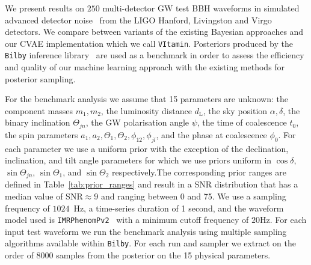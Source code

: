 \documentclass[%
showpacs,
nofootinbib,
 amsmath,amssymb,
 aps,
 twocolumn,
 prl,
 reprint,
floatfix,
]{revtex4-1}
\begin{document}
%
%

%
%
%
%
We present results on $250$ multi-detector \ac{GW} test \ac{BBH}
waveforms in simulated advanced detector noise~\cite{aligo_noisecurves}
from the LIGO Hanford, Livingston and Virgo detectors. We compare between
variants of the existing Bayesian approaches and our \ac{CVAE} implementation
which we call \texttt{VItamin}. Posteriors produced by the \texttt{Bilby}
inference library~\cite{1811.02042} are used as a benchmark in order to assess
the efficiency and quality of our machine learning approach with the existing
methods for posterior sampling.

%
%
For the benchmark analysis we assume that 15 parameters are
unknown: the component masses
$m_1,m_2$, the luminosity distance $d_{\text{L}}$, the sky position
$\alpha,\delta$, the binary inclination $\Theta_{jn}$, the \ac{GW} polarisation
angle ${\psi}$, the time of coalescence $t_{0}$, the spin parameters $a_1,a_2,
\Theta_1,\Theta_2,\phi_{12},\phi_{jl}$, and the phase at coalescence
$\phi_0$. For each parameter we use a uniform prior with the exception of 
the declination, inclination, and tilt angle parameters for 
which we use priors uniform in $\cos\delta$, $\sin\Theta_{jn}$, $\sin\Theta_1$, 
and $\sin\Theta_2$ respectively.The corresponding prior ranges
are defined in Table~\ref{tab:prior_ranges} and result in a  \ac{SNR}
distribution that has a median value of $\text{SNR}\approx 9$ and ranging between 0 and 75.
We use a sampling frequency of $1024$~Hz, a time-series duration of 1 second, and
the waveform model used is \texttt{IMRPhenomPv2}~\cite{1809.10113} with a
minimum cutoff frequency of $20$Hz. For each input test waveform we run the
benchmark analysis using multiple sampling algorithms available within
\texttt{Bilby}. For each run and sampler we extract on the order of 8000
samples from the posterior on the 15 physical parameters.  
\end{document}
